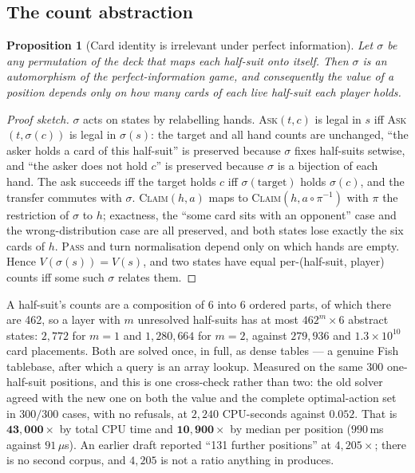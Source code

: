 \documentclass[11pt,letterpaper]{article}
\newtheorem{proposition}{Proposition}
\begin{document}
\subsection{The count abstraction}

\begin{proposition}[Card identity is irrelevant under perfect information]
\label{prop:abstraction}
Let $\sigma$ be any permutation of the deck that maps each half-suit onto
itself. Then $\sigma$ is an automorphism of the perfect-information game, and
consequently the value of a position depends only on how many cards of each
live half-suit each player holds.
\end{proposition}

\begin{proof}[Proof sketch]
$\sigma$ acts on states by relabelling hands. \textsc{Ask}$(t,c)$ is legal in
$s$ iff \textsc{Ask}$(t,\sigma(c))$ is legal in $\sigma(s)$: the target and all
hand counts are unchanged, ``the asker holds a card of this half-suit'' is
preserved because $\sigma$ fixes half-suits setwise, and ``the asker does not
hold $c$'' is preserved because $\sigma$ is a bijection of each hand. The ask
succeeds iff the target holds $c$ iff $\sigma(\text{target})$ holds
$\sigma(c)$, and the transfer commutes with $\sigma$. \textsc{Claim}$(h,a)$ maps
to \textsc{Claim}$(h, a\circ\pi^{-1})$ with $\pi$ the restriction of $\sigma$ to
$h$; exactness, the ``some card sits with an opponent'' case and the
wrong-distribution case are all preserved, and both states lose exactly the six
cards of $h$. \textsc{Pass} and turn normalisation depend only on which hands
are empty. Hence $V(\sigma(s)) = V(s)$, and two states have equal
per-(half-suit, player) counts iff some such $\sigma$ relates them.
\end{proof}

A half-suit's counts are a composition of 6 into 6 ordered parts, of which there
are 462, so a layer with $m$ unresolved half-suits has at most $462^m \times 6$
abstract states: $2{,}772$ for $m=1$ and $1{,}280{,}664$ for $m=2$, against
$279{,}936$ and $1.3\times10^{10}$ card placements. Both are solved once, in
full, as dense tables --- a genuine Fish tablebase, after which a query is an
array lookup. Measured on the same $300$ one-half-suit positions, and this is
one cross-check rather than two: the old solver agreed with the new one on both
the value and the complete optimal-action set in $300/300$ cases, with no
refusals, at $2{,}240$ CPU-seconds against $0.052$. That is
$\mathbf{43{,}000\times}$ by total CPU time and
$\mathbf{10{,}900\times}$ by median per position ($990$\,ms against
$91\,\mu$s). An earlier draft reported ``131 further positions'' at
$4{,}205\times$; there is no second corpus, and $4{,}205$ is not a ratio
anything in  produces.
\end{document}
